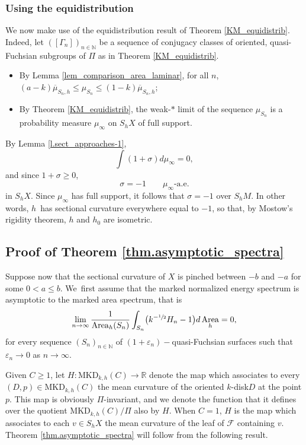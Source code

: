 \documentclass[10pt]{amsart}
\newcommand{\kdisk}{$k$\nobreakdash-disk\xspace}
\theoremstyle{plain}
\theoremstyle{definition}
\newcommand{\R}{{\mathbb R}}
\newcommand{\N}{{\mathbb N}}
\newcommand{\cF}{{\mathcal F}}
\let\eps\varepsilon
\newcommand{\MKD}{\mathrm{MKD}}
\DeclareMathOperator{\Area}{Area}
\begin{document}
\subsubsection{Using the equidistribution} We now make use of the equidistribution result of Theorem \ref{KM_equidistrib}. Indeed, let $([\Gamma_n])_{n\in\N}$ be a sequence of conjugacy classes of oriented, quasi-Fuchsian subgroups of $\Pi$ as in Theorem \ref{KM_equidistrib}.
\begin{itemize}
\item By Lemma \ref{lem_comparison_area_laminar}, for all $n$, $(a-k)\overline\mu_{S_n,h}\leq\mu_{S_n}\leq(1-k)\overline\mu_{S_n,h}$;
\item By Theorem \ref{KM_equidistrib}, the weak-$\ast$ limit of the sequence $\mu_{S_n}$ is a probability measure $\mu_\infty$ on $S_hX$ of full support.
\end{itemize}
By Lemma \ref{l.sect_approaches-1},
\begin{equation*}
\int(1+\sigma)d\mu_\infty=0,
\end{equation*}
and since $1+\sigma\geq 0$,
\begin{equation*}
\sigma=-1\qquad \mu_\infty\text{-a.e.}
\end{equation*} in $S_hX$. Since $\mu_\infty$ has full support, it follows that $\sigma=-1$ over $S_hM$. In other words, $h$~has sectional curvature everywhere equal to $-1$, so that, by Mostow's rigidity theorem, $h$ and $h_0$ are isometric.

\subsection{Proof of Theorem \ref{thm.asymptotic_spectra}}\label{ss.proof_of_thm_B}

Suppose now that the sectional curvature of $X$ is pinched between $-b$ and $-a$ for some $0<a\leq b$. We~first assume that the marked normalized energy spectrum is asymptotic to the marked area spectrum, that is
\begin{equation}\label{eq.hypothesis}
\lim_{n\to\infty}\frac{1}{\Area_h(S_n)}\int_{S_n}\bigl(k^{-\sfrac{1}{2}}H_n-1\bigr)d\Area_h=0,
\end{equation}
for every sequence $(S_n)_{n \in\N}$ of $(1+\eps_n)-$quasi-Fuchsian surfaces such that $\eps_n\to 0$ as $n\to\infty$.

Given $C\geq 1$, let $H:\MKD_{k,h}(C)\to\R$ denote the map which associates to every $(D,p)\in \MKD_{k,h}(C)$ the mean curvature of the oriented \kdisk $D$ at the point $p$. This map is obviously $\Pi$-invariant, and we denote the function that it defines over the quotient $\MKD_{k,h}(C)/\Pi$ also by $H$. When $C=1$, $H$ is the map which associates to each $v\in S_hX$ the mean curvature of the leaf of $\cF$ containing $v$. Theorem \ref{thm.asymptotic_spectra} will follow from the following result.
\end{document}
